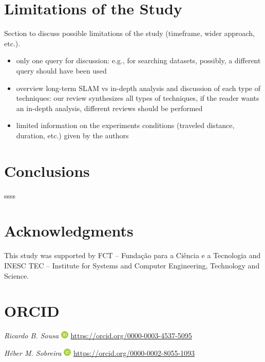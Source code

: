 \documentclass[10pt,a4paper,notitlepage,twocolumn,oneside]{article}
\begin{document}
\section{Limitations of the Study}
\label{sec:limitations}

Section to discuss possible limitations of the study (timeframe, wider approach, etc.).

\begin{itemize}\setlength\itemsep{-0.5em}
\item only one query for discussion: e.g., for searching datasets, possibly, a different query should have been used
\item overview long-term SLAM vs in-depth analysis and discussion of each type of techniques: our review synthesizes all types of techniques, if the reader wants an in-depth analysis, different reviews should be performed
\item limited information on the experiments conditions (traveled distance, duration, etc.) given by the authors
\end{itemize}

\section{Conclusions}
\label{sec:conclusions}

ssss



\section*{Acknowledgments}

This study was supported by FCT -- Fundação para a Ciência e a Tecnologia and INESC TEC -- Institute for Systems and Computer Engineering, Technology and Science.

\section*{ORCID}

\noindent \textit{Ricardo B. Sousa} \includegraphics[width=1em]{orcid.pdf} \href{https://orcid.org/0000-0003-4537-5095}{https://orcid.org/0000-0003-4537-5095}

\noindent \textit{H\'{e}ber M. Sobreira} \includegraphics[width=1em]{orcid.pdf} \href{https://orcid.org/0000-0002-8055-1093}{https://orcid.org/0000-0002-8055-1093}
\end{document}
